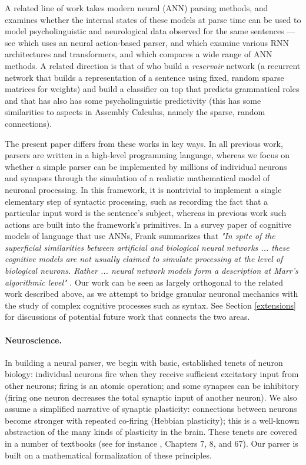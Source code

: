 \documentclass[11pt,a4paper]{article}
\begin{document}
A related line of work takes modern neural (ANN) parsing methods, and examines whether the internal states of these models at parse time can be used to model psycholinguistic and neurological data observed for the same sentences --- see \citet{findingsyntax} which uses an neural action-based parser, \citet{FrankRNNTransformer}  and \citet{FrankRNNReading} which examine various RNN architectures and transformers, and \citet{Schrimpf} which compares a wide range of ANN methods. A related direction is that of \citet{Hinaut} who build a {\em reservoir} network (a recurrent network that builds a representation of a sentence using fixed, random sparse matrices for weights) and build a classifier on top that predicts grammatical roles and that has also has some psycholinguistic predictivity (this has some similarities to aspects in Assembly Calculus, namely the sparse, random connections).

The present paper differs from these works in key ways.  In all previous work, parsers are written in a high-level programming language, whereas we focus on whether a simple parser can be implemented by millions of individual neurons and synapses through the simulation of a realistic mathematical model of neuronal processing.  In this framework, it is nontrivial to implement a single elementary step of syntactic processing, such as recording the fact that a particular input word is the sentence's subject, whereas in previous work such actions are built into the framework's primitives. In a survey paper of cognitive models of language that use ANNs, Frank summarizes that {\em "In spite of the superficial similarities between artificial and biological neural networks ... these cognitive models are not usually claimed to
simulate processing at the level of biological neurons. Rather ... neural network models form a description at Marr's algorithmic level"} \cite{FrankSurvey}. Our work can be seen as largely orthogonal to the related work described above, as we attempt to bridge granular neuronal mechanics with the study of complex cognitive processes such as syntax. See Section \ref{extensions} for discussions of potential future work that connects the two areas.

\paragraph{Neuroscience.} In building a neural parser, we begin with basic, established tenets of neuron biology: individual neurons fire when they receive sufficient excitatory input from other neurons; firing is an atomic operation; and some synapses can be inhibitory (firing one neuron decreases the total synaptic input of another neuron). We also assume a simplified narrative of synaptic plasticity: connections between neurons become stronger with repeated co-firing (Hebbian plasticity); this is a well-known abstraction of the many kinds of plasticity in the brain.  These tenets are covered in a number of textbooks (see for instance \citet{NeuralScience}, Chapters 7, 8, and 67). Our parser is built on a mathematical formalization of these principles.
\end{document}
